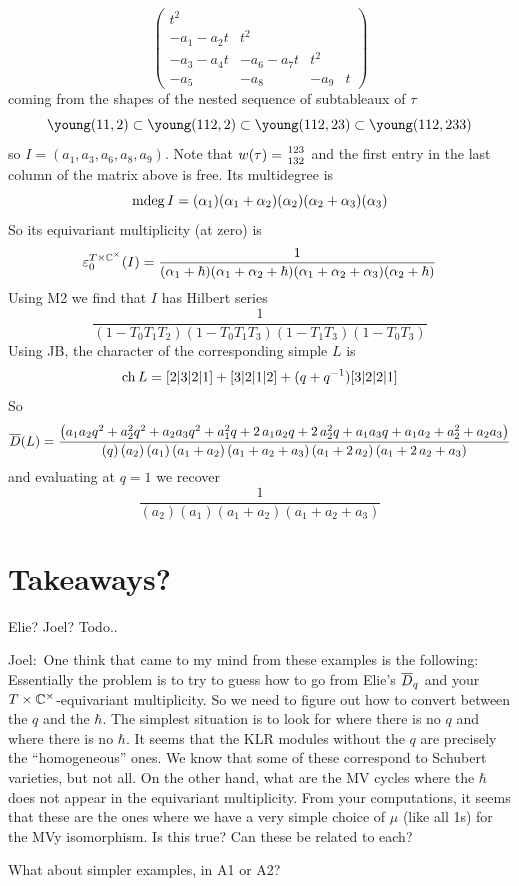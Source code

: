 \documentclass[11pt]{article}
\newcommand{\joel}[1]{{\color{red!50!orange}Joel:~#1}}
\newcommand{\todo}[1]{{\color{red!50!white}\textbf{#1}}} %
\begin{document}
\begin{description}
$$\begin{pmatrix}
        t^2 & \\
        - a_1 - a_2 t & t^2 \\
        -a_3 -a_4 t & -a_6 - a_7t & t^2 \\
        - a_5 & -a_8 & -a_9 & t
\end{pmatrix}
$$
coming from the shapes of the nested sequence of subtableaux of $\tau$ 
$$
\young(11,2) \subset \young(112,2) \subset \young(112,23) \subset \young(112,233)
$$
so $I = \left({a}_{1},{a}_{3},{a}_{6},{a}_{8},{a}_{9}\right)$. 
Note that $w(\tau) = {123\atop 132}$ and the first entry in the last column of the matrix above is free.
Its multidegree is
$$
\operatorname{mdeg} I 
= (\alpha_1) (\alpha_1 + \alpha_2) (\alpha_2) (\alpha_2 + \alpha_3) (\alpha_3)
$$ 
So its equivariant multiplicity (at zero) is 
$$
\varepsilon^{T\times\mathbb C^\times}_0(I) = 
\frac 1 {(\alpha_1 + \hbar)(\alpha_1 + \alpha_2 + \hbar) (\alpha_1 + \alpha_2 + \alpha_3)(\alpha_2 + \hbar)}
$$
Using M2 we find that $I$ has Hilbert series
\[
    \frac{1}{\left(1-{T}_{0}{T}_{1}{T}_{2}\right)\left(1-{T}_{0}{T}_{1}{T}_{3}\right)\left(1-{T}_{1}{T}_{3}\right)\left(1-{T}_{0}{T}_{3}\right)}
\]
Using JB, the character of the corresponding simple $L$ is 
\[
    \operatorname{ch} L = [2|3|2|1]+[3|2|1|2]+(q+q^{-1})[3|2|2|1]
\]
So 
{\small 
\[
    \overline{D}(L) = \frac{\left({a}_{1}{a}_{2}q^{2}+{a}_{2}^{2}q^{2}+{a}_{2}{a}_{3}q^{2}+{a}_{1}^{2}q+2\,{a}_{1}{a}_{2}q+2\,{a}_{2}^{2}q+{a}_{1}{a}_{3}q+{a}_{1}{a}_{2}+{a}_{2}^{2}+{a}_{2}{a}_{3}\right)}{\left(q\right)\left({a}_{2}\right)\left({a}_{1}\right)\left({a}_{1}+{a}_{2}\right)\left({a}_{1}+{a}_{2}+{a}_{
    3}\right)\left({a}_{1}+2\,{a}_{2}\right)\left({a}_{1}+2\,{a}_{2}+{a}_{3}\right)}
\]}
and evaluating at $q = 1$ we recover
\[
    \frac{1}{\left({a}_{2}\right)\left({a}_{1}\right)\left({a}_{1}+{a}_{2}\right)\left({a}_{1}+{a}_{2}+{a}_{3}\right)}    
\]
\end{description}
% 
\section*{Takeaways?}
Elie? Joel? Todo.. 
\joel{One think that came to my mind from these examples is the following:
Essentially the problem is to try to guess how to go from Elie's
$\overline{D}_q$ and your $T \times \mathbb C^\times$-equivariant multiplicity. So we need
to figure out how to convert between the $q$ and the $\hbar$.  The
simplest situation is to look for where there is no $q$ and where there
is no $\hbar$.  It seems that the KLR modules without the $q$ are
precisely the ``homogeneous'' ones.  We know that some of these
correspond to Schubert varieties, but not all.  On the other hand,
what are the MV cycles where the $\hbar$ does not appear in the
equivariant multiplicity. From your computations, it seems that these
are the ones where we have a very simple choice of $\mu$ (like all 1s)
for the MVy isomorphism. Is this true? Can these be related to each?

What about simpler examples, in A1 or A2?}
\end{document}
